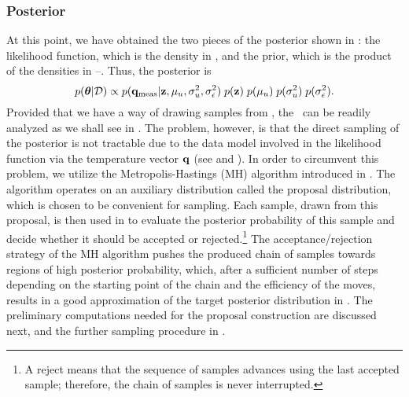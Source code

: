 \subsubsection{Posterior}
At this point, we have obtained the two pieces of the posterior shown in : the likelihood function, which is the density in , and the prior, which is the product of the densities in --. Thus, the posterior is
\begin{equation} \elabel{posterior}
  \f{\vparam | \Data} \propto \f{\mvT_\meas | \vz, \mu_\u, \sigma^2_\u, \sigma^2_\noise} \; \f{\vz} \; \f{\mu_\u} \; \f{\sigma^2_\u} \; \f{\sigma^2_\noise}.
\end{equation}
Provided that we have a way of drawing samples from , the \qoi\ can be readily analyzed as we shall see in .
The problem, however, is that the direct sampling of the posterior is not tractable due to the data model involved in the likelihood function via the temperature vector $\mathbf{q}$ (see  and ).
In order to circumvent this problem, we utilize the Metropolis-Hastings (MH) algorithm \cite{gelman2004} introduced in .
The algorithm operates on an auxiliary distribution called the proposal distribution, which is chosen to be convenient for sampling.
Each sample, drawn from this proposal, is then used in  to evaluate the posterior probability of this sample and decide whether it should be accepted or rejected.\footnote{A reject means that the sequence of samples advances using the last accepted sample; therefore, the chain of samples is never interrupted.}
The acceptance/rejection strategy of the MH algorithm pushes the produced chain of samples towards regions of high posterior probability, which, after a sufficient number of steps depending on the starting point of the chain and the efficiency of the moves, results in a good approximation of the target posterior distribution in .
The preliminary computations needed for the proposal construction are discussed next, and the further sampling procedure in .
